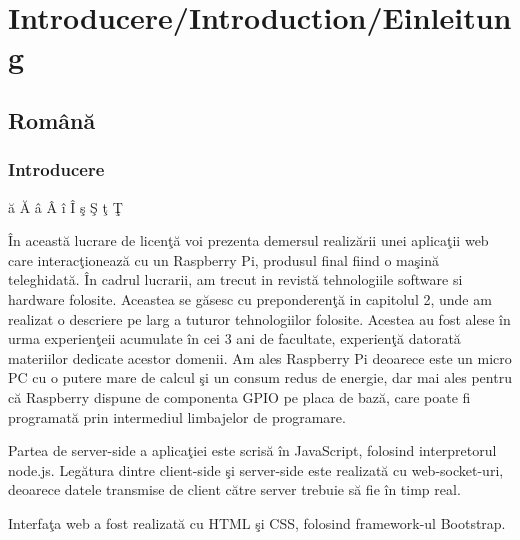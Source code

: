 
\chapter{Introducere/Introduction/Einleitung} %

\label{Chapter1} %


\section{Rom\^ an\u a}
\subsection{Introducere}
\u{a}
\u{A}
\^{a}
\^{A}
\^{i}
\^{I}
\c{s}
\c{S}
\c{t}
\c{T} 


\^In aceast\u a lucrare de licen\c t\u a voi prezenta demersul realiz\u arii unei aplica\c tii web care interac\c tioneaz\u a cu un Raspberry Pi, produsul final fiind o ma\c sin\u a teleghidat\u a. \^ In cadrul lucrarii, am trecut in revist\u a tehnologiile software si hardware folosite. Aceastea se g\u asesc cu preponderen\c t\u a in capitolul 2, unde am realizat o descriere pe larg a tuturor tehnologiilor folosite. Acestea au fost alese \^ in urma experien\c teii acumulate \^ in cei 3 ani de facultate, experien\c t\u a datorat\u a materiilor dedicate acestor domenii. Am ales Raspberry Pi deoarece este un micro PC cu o putere mare de calcul \c si un consum redus de energie, dar mai ales pentru c\u a Raspberry dispune de componenta GPIO pe placa de baz\u a, care poate fi programat\u a prin intermediul  limbajelor de programare. 

Partea de server-side a aplica\c tiei este scris\u a \^ in JavaScript, folosind interpretorul node.js. Leg\u atura dintre client-side \c si server-side este realizat\u a cu web-socket-uri, deoarece datele transmise de client c\u atre server trebuie s\u a fie \^ in timp real.

Interfa\c ta web a fost realizat\u a cu HTML \c si CSS, folosind framework-ul Bootstrap.

